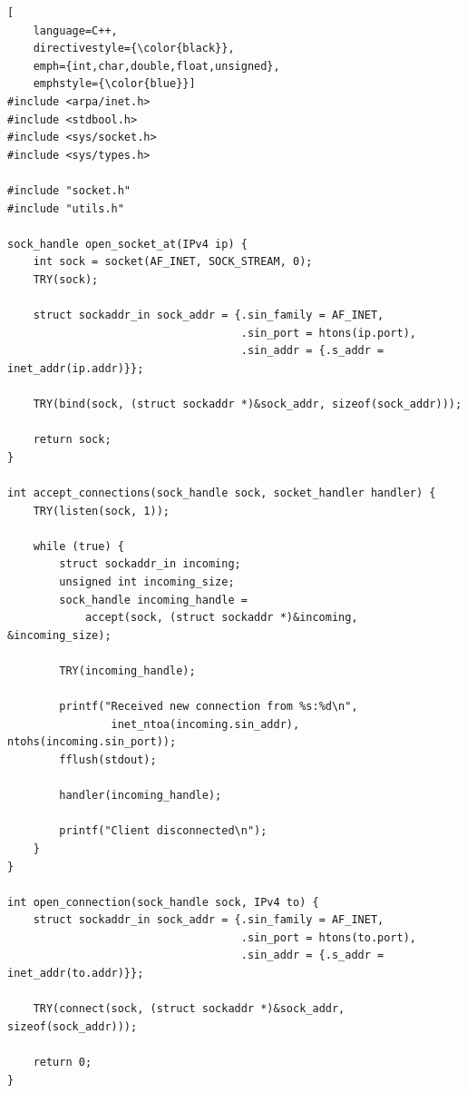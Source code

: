 \begin{lstlisting}[
    language=C++,
    directivestyle={\color{black}}, 
    emph={int,char,double,float,unsigned}, 
    emphstyle={\color{blue}}]
#include <arpa/inet.h>
#include <stdbool.h>
#include <sys/socket.h>
#include <sys/types.h>

#include "socket.h"
#include "utils.h"

sock_handle open_socket_at(IPv4 ip) {
    int sock = socket(AF_INET, SOCK_STREAM, 0);
    TRY(sock);

    struct sockaddr_in sock_addr = {.sin_family = AF_INET,
                                    .sin_port = htons(ip.port),
                                    .sin_addr = {.s_addr = inet_addr(ip.addr)}};

    TRY(bind(sock, (struct sockaddr *)&sock_addr, sizeof(sock_addr)));

    return sock;
}

int accept_connections(sock_handle sock, socket_handler handler) {
    TRY(listen(sock, 1));

    while (true) {
        struct sockaddr_in incoming;
        unsigned int incoming_size;
        sock_handle incoming_handle =
            accept(sock, (struct sockaddr *)&incoming, &incoming_size);

        TRY(incoming_handle);

        printf("Received new connection from %s:%d\n",
                inet_ntoa(incoming.sin_addr), ntohs(incoming.sin_port));
        fflush(stdout);

        handler(incoming_handle);

        printf("Client disconnected\n");
    }
}

int open_connection(sock_handle sock, IPv4 to) {
    struct sockaddr_in sock_addr = {.sin_family = AF_INET,
                                    .sin_port = htons(to.port),
                                    .sin_addr = {.s_addr = inet_addr(to.addr)}};

    TRY(connect(sock, (struct sockaddr *)&sock_addr, sizeof(sock_addr)));

    return 0;
}
\end{lstlisting}